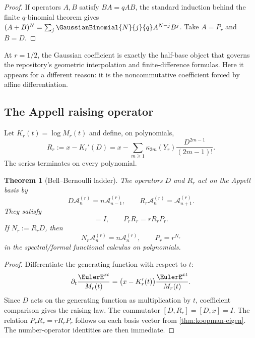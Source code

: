 \documentclass[11pt,a4paper]{article}
\newtheorem{theorem}{Theorem}[section]
\theoremstyle{definition}
\theoremstyle{remark}
\newcommand{\Acal}{\mathcal A}
\begin{document}
\begin{proof}
If operators $A,B$ satisfy $BA=qAB$, the standard induction behind the finite $q$-binomial theorem gives
$(A+B)^N=\sum_j\GaussianBinomial{N}{j}{q}A^{N-j}B^j$.
Take $A=P_r$ and $B=D$.
\end{proof}

At $r=1/2$, the Gaussian coefficient is exactly the half-base object that governs the repository's geometric interpolation and finite-difference formulas. Here it appears for a different reason: it is the noncommutative coefficient forced by affine differentiation.

\subsection{The Appell raising operator}

Let $K_r(t)=\log M_r(t)$ and define, on polynomials,
\begin{equation}
 R_r:=x-K_r'(D)
 =x-\sum_{m\ge1}\kappa_{2m}(Y_r)
 \frac{D^{2m-1}}{(2m-1)!}.
 \label{eq:raising}
\end{equation}
The series terminates on every polynomial.

\begin{theorem}[Bell--Bernoulli ladder]
\label{thm:ladder}
The operators $D$ and $R_r$ act on the Appell basis by
\begin{equation}
 D\Acal_n^{(r)}=n\Acal_{n-1}^{(r)},
 \qquad
 R_r\Acal_n^{(r)}=\Acal_{n+1}^{(r)}.
 \label{eq:ladder-actions}
\end{equation}
They satisfy
\begin{equation}
 [D,R_r]=I,
 \qquad
 P_rR_r=rR_rP_r.
 \label{eq:ladder-commutations}
\end{equation}
If $N_r:=R_rD$, then
\begin{equation}
 N_r\Acal_n^{(r)}=n\Acal_n^{(r)},
 \qquad
 \boxed{P_r=r^{N_r}}
 \label{eq:number-operator}
\end{equation}
in the spectral/formal functional calculus on polynomials.
\end{theorem}

\begin{proof}
Differentiate the generating function with respect to $t$:
\[
 \partial_t\frac{\EulerE^{xt}}{M_r(t)}
 =\bigl(x-K_r'(t)\bigr)\frac{\EulerE^{xt}}{M_r(t)}.
\]
Since $D$ acts on the generating function as multiplication by $t$, coefficient comparison gives the raising law. The commutator $[D,R_r]=[D,x]=I$. The relation $P_rR_r=rR_rP_r$ follows on each basis vector from \cref{thm:koopman-eigen}. The number-operator identities are then immediate.
\end{proof}
\end{document}
